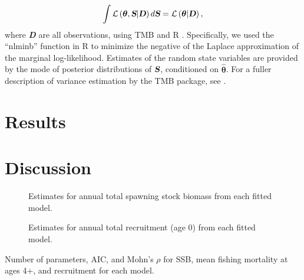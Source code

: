 \documentclass[12pt,letterpaper, leqno]{article}
\begin{document}
\vspace{-12pt}
\begin{equation*}
\int {\cal L}\left(\bm{\theta},\textsl{\textbf{S}} | \textsl{\textbf{D}}\right) d\textsl{\textbf{S}} = {\cal L}\left(\bm{\theta} | \textsl{\textbf{D}}\right),
\end{equation*}
where \textsl{\textbf{D}} are all observations, using TMB \citep{kristensenetal16} and R \citep{R17}. Specifically, we used the ``nlminb'' function in R to minimize the negative of the Laplace approximation of the marginal log-likelihood. Estimates of the random state variables are provided by the mode of posterior distributions of $\textsl{\textbf{S}}$, conditioned on $\widehat {\bm{\theta}}$. For a fuller description of variance estimation by the TMB package, see \citet{kristensenetal16}.


\section*{Results}

\section*{Discussion}

\clearpage





\clearpage


\begin{figure}
\caption{Estimates for annual total spawning stock biomass from each fitted model.}\label{SSB_compare}
\begin{center}
\end{center}
\end{figure}

\begin{figure}
\caption{Estimates for annual total recruitment (age 0) from each fitted model.}\label{R_compare}
\begin{center}
\end{center}
\end{figure}

\clearpage


\begin{landscape}
\begin{table}
\begin{center}
\caption{Number of parameters, AIC, and Mohn's $\rho$ for SSB, mean fishing mortality at ages 4+, and recruitment for each model.}\label{model_compare}
%
\end{center}
\end{table}
\end{landscape}
\end{document}
